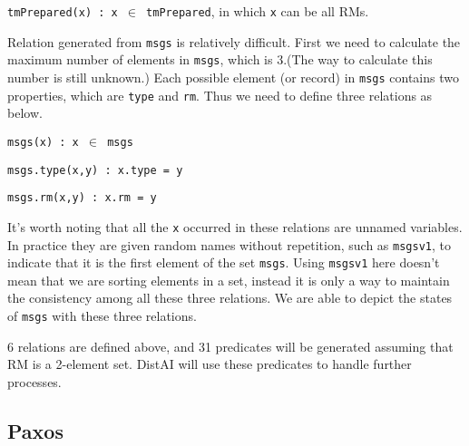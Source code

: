 {\texttt{tmPrepared(x) : x $\in$ tmPrepared}}, in which {\texttt{x}} can be all RMs.

Relation generated from {\texttt{msgs}} is relatively difficult. First we need to calculate the maximum number of elements in {\texttt{msgs}}, which is 3.(The way to calculate this number is still unknown.) Each possible element (or record) in {\texttt{msgs}} contains two properties, which are {\texttt{type}} and {\texttt{rm}}. Thus we need to define three relations as below.

{\texttt{msgs(x) : x $\in$ msgs}}

{\texttt{msgs.type(x,y) : x.type = y}}

{\texttt{msgs.rm(x,y) : x.rm = y}}

It's worth noting that all the {\texttt{x}} occurred in these relations are unnamed variables. In practice they are given random names without repetition, such as {\texttt{msgsv1}}, to indicate that it is the first element of the set {\texttt{msgs}}. Using {\texttt{msgsv1}} here doesn't mean that we are sorting elements in a set, instead it is only a way to maintain the consistency among all these three relations. We are able to depict the states of {\texttt{msgs}} with these three relations.

6 relations are defined above, and 31 predicates will be generated assuming that RM is a 2-element set. DistAI will use these predicates to handle further processes.

\subsection{Paxos} \label{ss:paxos}

